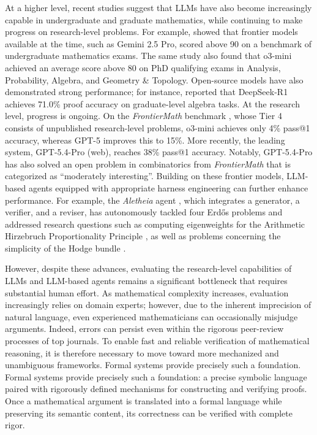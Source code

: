 \documentclass[]{pkuai4m}
\theoremstyle{plain}
\theoremstyle{definition}
\begin{document}
At a higher level, recent studies suggest that LLMs have also become increasingly capable in undergraduate and graduate mathematics, while continuing to make progress on research-level problems. For example, \cite{ju2026ai} showed that frontier models available at the time, such as Gemini 2.5 Pro, scored above 90 on a benchmark of undergraduate mathematics exams. The same study also found that o3-mini achieved an average score above 80 on PhD qualifying exams in Analysis, Probability, Algebra, and Geometry \& Topology. Open-source models have also demonstrated strong performance; for instance, \cite{jiang2025fate} reported that DeepSeek-R1 achieves 71.0\% proof accuracy on graduate-level algebra tasks. At the research level, progress is ongoing. On the \textit{FrontierMath} benchmark \cite{glazer2024frontiermath}, whose Tier 4 consists of unpublished research-level problems, o3-mini achieves only 4\% pass@1 accuracy, whereas GPT-5 improves this to 15\%. More recently, the leading system, GPT-5.4-Pro (web), reaches 38\% pass@1 accuracy. Notably, GPT-5.4-Pro has also solved an open problem in combinatorics from \textit{FrontierMath} that is categorized as “moderately interesting”. Building on these frontier models, LLM-based agents equipped with appropriate harness engineering can further enhance performance. For example, the \textit{Aletheia} agent \cite{feng2026towards}, which integrates a generator, a verifier, and a reviser, has autonomously tackled four Erdős problems \cite{feng2026semi} and addressed research questions such as computing eigenweights for the Arithmetic Hirzebruch Proportionality Principle \cite{feng2026eigenweights}, as well as problems concerning the simplicity of the Hodge bundle \cite{patel2026simplicity}.

However, despite these advances, evaluating the research-level capabilities of LLMs and LLM-based agents remains a significant bottleneck that requires substantial human effort. As mathematical complexity increases, evaluation increasingly relies on domain experts; however, due to the inherent imprecision of natural language, even experienced mathematicians can occasionally misjudge arguments. Indeed, errors can persist even within the rigorous peer-review processes of top journals. To enable fast and reliable verification of mathematical reasoning, it is therefore necessary to move toward more mechanized and unambiguous frameworks. Formal systems provide precisely such a foundation. Formal systems provide precisely such a foundation: a precise symbolic language paired with rigorously defined mechanisms for constructing and verifying proofs. Once a mathematical argument is translated into a formal language while preserving its semantic content, its correctness can be verified with complete rigor.
\end{document}
